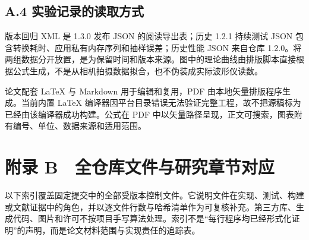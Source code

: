\documentclass[UTF8,zihao=-4,openany]{ctexbook}
\begin{document}
\section*{A.4 实验记录的读取方式}
版本回归 XML 是 1.3.0 发布 JSON 的阅读导出表；历史 1.2.1 持续测试 JSON 包含转换耗时、应用私有内存序列和抽样误差；历史性能 JSON 来自仓库 1.2.0。将两组数据分开放置，是为保留时间和版本来源。图中的理论曲线由排版脚本直接根据公式生成，不是从相机拍摄数据拟合，也不伪装成实际波形仪读数。

论文配套 LaTeX 与 Markdown 用于编辑和复用，PDF 由本地矢量排版程序生成。当前内置 LaTeX 编译器因平台目录错误无法验证完整工程，故不把源稿标为已经由该编译器成功构建。公式在 PDF 中以矢量路径呈现，正文可搜索，图表附有编号、单位、数据来源和适用范围。


\chapter*{附录 B　全仓库文件与研究章节对应}
以下索引覆盖固定提交中的全部受版本控制文件。它说明文件在实现、测试、构建或文献证据中的角色，并以逐文件行数与哈希清单作为可复核补充。第三方库、生成代码、图片和许可不按项目手写算法处理。索引不是“每行程序均已经形式化证明”的声明，而是论文材料范围与实现责任的追踪表。
\end{document}
